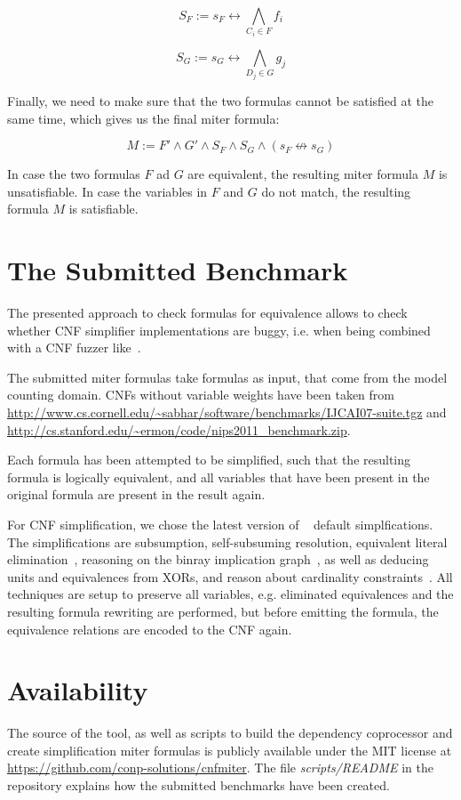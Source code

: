 \documentclass[conference]{IEEEtran}
\begin{document}
\[S_F := s_F \leftrightarrow \bigwedge_{C_i \in F} f_i \]

\[S_G := s_G \leftrightarrow \bigwedge_{D_j \in G} g_j \]

Finally, we need to make sure that the two formulas cannot be satisfied at the same time,
which gives us the final miter formula:

\[ M := F' \land G' \land S_F \land S_G \land (s_F \not \leftrightarrow s_G) \]

\noindent
In case the two formulas $F$ ad $G$ are equivalent, the resulting miter formula $M$ is unsatisfiable.
In case the variables in $F$ and $G$ do not match, the resulting formula $M$ is satisfiable.

\section{The Submitted Benchmark}

The presented approach to check formulas for equivalence allows to check whether CNF simplifier implementations are buggy, i.e. when being combined with a CNF fuzzer like~\cite{BrummayerB:2009}.

The submitted miter formulas take formulas as input, that come from the model counting domain.
CNFs without variable weights have been taken from \url{http://www.cs.cornell.edu/~sabhar/software/benchmarks/IJCAI07-suite.tgz} and \url{http://cs.stanford.edu/~ermon/code/nips2011_benchmark.zip}.

Each formula has been attempted to be simplified, such that the resulting formula is logically equivalent, and all variables that have been present in the original formula are present in the result again.

For CNF simplification, we chose the latest version of \coprocessor~\cite{coprocessor2} default simplfications.
The simplifications are subsumption, self-subsuming resolution, equivalent literal elimination~\cite{ee-withSCC}, reasoning on the binray implication graph~\cite{DBLP:conf/sat/HeuleJB11}, as well as deducing units and equivalences from XORs, and reason about cardinality constraints~\cite{MlazyCard}.
All techniques are setup to preserve all variables, e.g. eliminated equivalences and the resulting formula rewriting are performed, but before emitting the formula, the equivalence relations are encoded to the CNF again.

\section{Availability}

The source of the tool, as well as scripts to build the dependency coprocessor and create simplification miter formulas is publicly available under the MIT license at \url{https://github.com/conp-solutions/cnfmiter}.
The file \emph{scripts/README} in the repository explains how the submitted benchmarks have been created.




\end{document}
